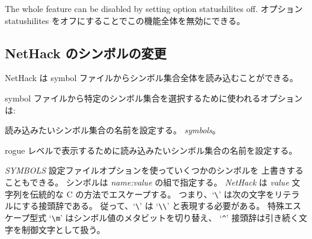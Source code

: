The whole feature can be disabled by setting option statushilites off.
オプション statushilites をオフにすることでこの機能全体を無効にできる。


\subsection*{NetHack のシンボルの変更}

NetHack は symbol ファイルからシンボル集合全体を読み込むことができる。

symbol ファイルから特定のシンボル集合を選択するために使われるオプションは:

\blist{}
\item[\ib{symset}]
読み込みたいシンボル集合の名前を設定する。
{\it symbols\/}。

\item[\ib{roguesymset}]
rogue レベルで表示するために読み込みたいシンボル集合の名前を設定する。
\elist

{\it SYMBOLS\/} 設定ファイルオプションを使っていくつかのシンボルを
上書きすることもできる。
シンボルは {\it name:value\/} の組で指定する。
{\it NetHack\/} は {\it value\/} 文字列を伝統的な C の方法でエスケープする。
つまり、`\verb+\+' は次の文字をリテラルにする接頭辞である。
従って、`\verb+\+' は `\verb+\\+' と表現する必要がある。
特殊エスケープ型式 `\verb+\m+' はシンボル値のメタビットを切り替え、
`{\tt \^{}}' 接頭辞は引き続く文字を制御文字として扱う。

